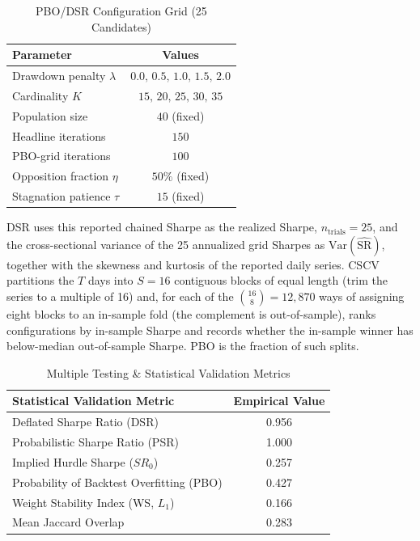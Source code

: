 \documentclass[11pt,a4paper]{article}
\begin{document}
\begin{table}[htbp]
\centering
\caption{PBO/DSR Configuration Grid (25 Candidates)}
\label{tab:pbo_grid}
\begin{tabular}{lc}
\toprule
\textbf{Parameter} & \textbf{Values} \\
\midrule
Drawdown penalty $\lambda$ & $0.0,\, 0.5,\, 1.0,\, 1.5,\, 2.0$ \\
Cardinality $K$ & $15,\, 20,\, 25,\, 30,\, 35$ \\
Population size & $40$ (fixed) \\
Headline iterations & $150$ \\
PBO-grid iterations & $100$ \\
Opposition fraction $\eta$ & $50\%$ (fixed) \\
Stagnation patience $\tau$ & $15$ (fixed) \\
\bottomrule
\end{tabular}
\end{table} DSR uses this reported chained Sharpe as the realized Sharpe, $n_{\text{trials}}=25$, and the cross-sectional variance of the 25 annualized grid Sharpes as $\mathrm{Var}(\widehat{\mathrm{SR}})$, together with the skewness and kurtosis of the reported daily series. CSCV partitions the $T$ days into $S=16$ contiguous blocks of equal length (trim the series to a multiple of 16) and, for each of the $\binom{16}{8}=12{,}870$ ways of assigning eight blocks to an in-sample fold (the complement is out-of-sample), ranks configurations by in-sample Sharpe and records whether the in-sample winner has below-median out-of-sample Sharpe. PBO is the fraction of such splits.

\begin{table}[htbp]
\centering
\caption{Multiple Testing \& Statistical Validation Metrics}
\label{tab:overfitting}
\begin{tabular}{lc}
\toprule
\textbf{Statistical Validation Metric} & \textbf{Empirical Value} \\
\midrule
Deflated Sharpe Ratio (DSR) & 0.956 \\
Probabilistic Sharpe Ratio (PSR) & 1.000 \\
Implied Hurdle Sharpe ($SR_0$) & 0.257 \\
Probability of Backtest Overfitting (PBO) & 0.427 \\
Weight Stability Index (WS, $L_1$) & 0.166 \\
Mean Jaccard Overlap & 0.283 \\
\bottomrule
\end{tabular}
\end{table}
\end{document}
